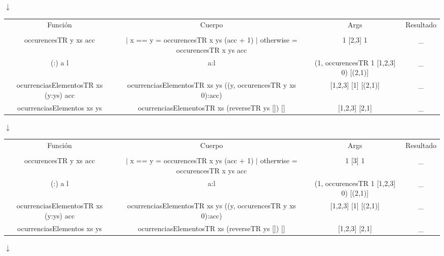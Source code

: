 \begin{enumerate}
{\begin{itemize}
{\begin{center}
                $\downarrow$
                
                \begin{NiceTabular}{|c c c c|}
                    Función & Cuerpo & Args & Resultado \\
                    &&&\\
                    occurencesTR y xs acc & $|$ x == y = occurencesTR x ys (acc + 1) $|$ otherwise = occurencesTR x ys acc & 1 [2,3] 1 & \_ \\ \hline
                    (:) a l & a:l & (1, occurencesTR 1 [1,2,3] 0) [(2,1)] & \_ \\ \hline
                    ocurrenciasElementosTR xs (y:ys) acc & ocurrenciasElementosTR xs ys ((y, occurencesTR y xs 0):acc) & [1,2,3] [1] [(2,1)] & \_ \\ \hline
                    ocurrenciasElementos xs ys & ocurrenciasElementosTR xs (reverseTR ys []) [] & [1,2,3] [2,1] & \_ \\ \hline
                \end{NiceTabular}

                $\downarrow$
                
                \begin{NiceTabular}{|c c c c|}
                    Función & Cuerpo & Args & Resultado \\
                    &&&\\
                    occurencesTR y xs acc & $|$ x == y = occurencesTR x ys (acc + 1) $|$ otherwise = occurencesTR x ys acc & 1 [3] 1 & \_ \\ \hline
                    (:) a l & a:l & (1, occurencesTR 1 [1,2,3] 0) [(2,1)] & \_ \\ \hline
                    ocurrenciasElementosTR xs (y:ys) acc & ocurrenciasElementosTR xs ys ((y, occurencesTR y xs 0):acc) & [1,2,3] [1] [(2,1)] & \_ \\ \hline
                    ocurrenciasElementos xs ys & ocurrenciasElementosTR xs (reverseTR ys []) [] & [1,2,3] [2,1] & \_ \\ \hline
                \end{NiceTabular}

                $\downarrow$
                

\end{center}}
\end{itemize}}
\end{enumerate}
